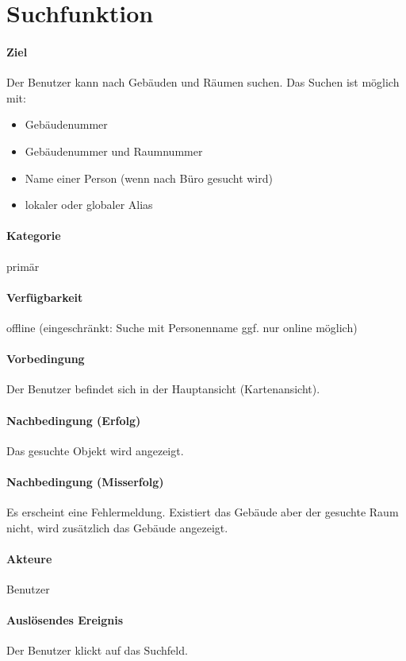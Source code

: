 \section{Suchfunktion}
\paragraph{Ziel}
Der Benutzer kann nach Gebäuden und Räumen suchen. 
Das Suchen ist möglich mit:
\begin{itemize}
    \item Gebäudenummer
    \item Gebäudenummer und Raumnummer
    \item Name einer Person (wenn nach Büro gesucht wird)
    \item lokaler oder globaler Alias
\end{itemize}

\paragraph{Kategorie}
primär
\paragraph{Verfügbarkeit}
offline (eingeschränkt: Suche mit Personenname ggf. nur online möglich)
\paragraph{Vorbedingung}
Der Benutzer befindet sich in der Hauptansicht (Kartenansicht).
\paragraph{Nachbedingung (Erfolg)}
Das gesuchte Objekt wird angezeigt.
\paragraph{Nachbedingung (Misserfolg)}
Es erscheint eine Fehlermeldung. Existiert das Gebäude aber der gesuchte Raum nicht, wird zusätzlich das Gebäude angezeigt.
\paragraph{Akteure}
Benutzer
\paragraph{Auslösendes Ereignis}
Der Benutzer klickt auf das Suchfeld.
